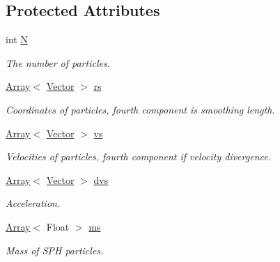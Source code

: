 \subsection*{Protected Attributes}
\begin{DoxyCompactItemize}
\item 
\hypertarget{classBody_a0f9839e3021bcd563d5b2eff97b96339}{}\label{classBody_a0f9839e3021bcd563d5b2eff97b96339} 
int \hyperlink{classBody_a0f9839e3021bcd563d5b2eff97b96339}{N}
\begin{DoxyCompactList}\small\item\em The number of particles. \end{DoxyCompactList}\item 
\hypertarget{classBody_aa1edcd0f5cc675e042fec4e494e52e48}{}\label{classBody_aa1edcd0f5cc675e042fec4e494e52e48} 
\hyperlink{classArray}{Array}$<$ \hyperlink{classBasicVector}{Vector} $>$ \hyperlink{classBody_aa1edcd0f5cc675e042fec4e494e52e48}{rs}
\begin{DoxyCompactList}\small\item\em Coordinates of particles, fourth component is smoothing length. \end{DoxyCompactList}\item 
\hypertarget{classBody_a08cf717fc912ebf9b792119c4b3808fd}{}\label{classBody_a08cf717fc912ebf9b792119c4b3808fd} 
\hyperlink{classArray}{Array}$<$ \hyperlink{classBasicVector}{Vector} $>$ \hyperlink{classBody_a08cf717fc912ebf9b792119c4b3808fd}{vs}
\begin{DoxyCompactList}\small\item\em Velocities of particles, fourth component if velocity divergence. \end{DoxyCompactList}\item 
\hypertarget{classBody_afc78fa820ba77712a298dcd1cab36254}{}\label{classBody_afc78fa820ba77712a298dcd1cab36254} 
\hyperlink{classArray}{Array}$<$ \hyperlink{classBasicVector}{Vector} $>$ \hyperlink{classBody_afc78fa820ba77712a298dcd1cab36254}{dvs}
\begin{DoxyCompactList}\small\item\em Acceleration. \end{DoxyCompactList}\item 
\hypertarget{classBody_a64fe5671c857851d4a21225e68291cd2}{}\label{classBody_a64fe5671c857851d4a21225e68291cd2} 
\hyperlink{classArray}{Array}$<$ Float $>$ \hyperlink{classBody_a64fe5671c857851d4a21225e68291cd2}{ms}
\begin{DoxyCompactList}\small\item\em Mass of S\+PH particles. \end{DoxyCompactList}\item 

\end{DoxyCompactItemize}
